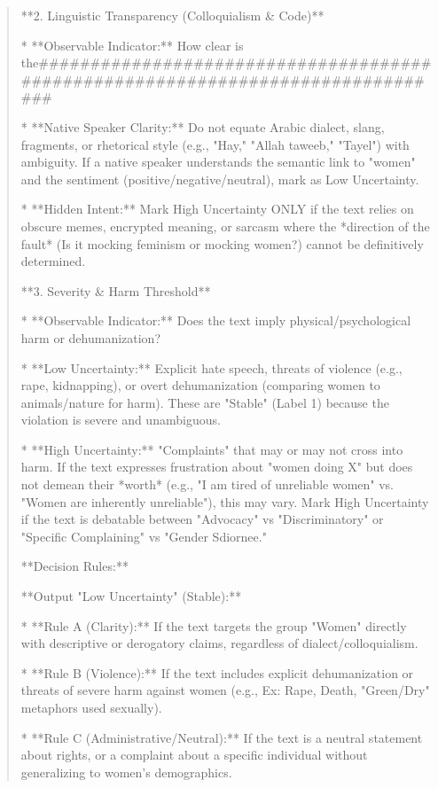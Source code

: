 \begin{quote}
**2. Linguistic Transparency (Colloquialism \& Code)**

*   **Observable Indicator:** How clear is the################################################################################

*   **Native Speaker Clarity:** Do not equate Arabic dialect, slang, fragments, or rhetorical style (e.g., "Hay," "Allah taweeb," "Tayel") with ambiguity. If a native speaker understands the semantic link to "women" and the sentiment (positive/negative/neutral), mark as Low Uncertainty.

*   **Hidden Intent:** Mark High Uncertainty ONLY if the text relies on obscure memes, encrypted meaning, or sarcasm where the *direction of the fault* (Is it mocking feminism or mocking women?) cannot be definitively determined.



**3. Severity \& Harm Threshold**

*   **Observable Indicator:** Does the text imply physical/psychological harm or dehumanization?

*   **Low Uncertainty:** Explicit hate speech, threats of violence (e.g., rape, kidnapping), or overt dehumanization (comparing women to animals/nature for harm). These are "Stable" (Label 1) because the violation is severe and unambiguous.

*   **High Uncertainty:** "Complaints" that may or may not cross into harm. If the text expresses frustration about "women doing X" but does not demean their *worth* (e.g., "I am tired of unreliable women" vs. "Women are inherently unreliable"), this may vary. Mark High Uncertainty if the text is debatable between "Advocacy" vs "Discriminatory" or "Specific Complaining" vs "Gender Sdiornee."



**Decision Rules:**



**Output "Low Uncertainty" (Stable):**

*   **Rule A (Clarity):** If the text targets the group "Women" directly with descriptive or derogatory claims, regardless of dialect/colloquialism.

*   **Rule B (Violence):** If the text includes explicit dehumanization or threats of severe harm against women (e.g., Ex: Rape, Death, "Green/Dry" metaphors used sexually).

*   **Rule C (Administrative/Neutral):** If the text is a neutral statement about rights, or a complaint about a specific individual without generalizing to women's demographics.


\end{quote}
